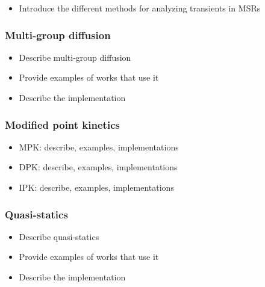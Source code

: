 \begin{itemize}
    \item Introduce the different methods for analyzing transients in \glspl{MSR}
\end{itemize}

\subsubsection{Multi-group diffusion}

\begin{itemize}
    \item Describe multi-group diffusion
    \item Provide examples of works that use it
    \item Describe the implementation
\end{itemize}


\subsubsection{Modified point kinetics}

\begin{itemize}
    \item \gls{MPK}: describe, examples, implementations
    \item \gls{DPK}: describe, examples, implementations
    \item IPK: describe, examples, implementations
\end{itemize}

\subsubsection{Quasi-statics}

\begin{itemize}
    \item Describe quasi-statics
    \item Provide examples of works that use it
    \item Describe the implementation
\end{itemize}


